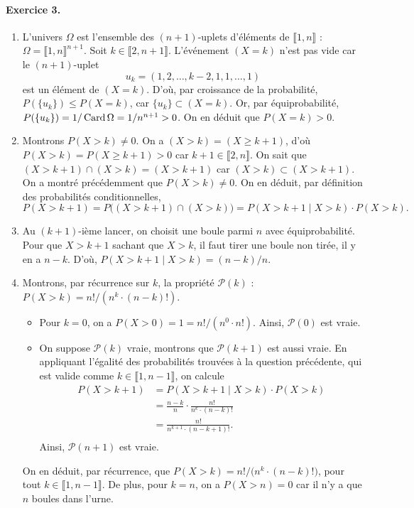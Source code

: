 \documentclass[a4paper]{article}
\begin{document}
	\paragraph{Exercice 3.}
	\begin{enumerate}
		\item L'univers $\Omega$ est l'ensemble des $(n+1)$-uplets d'éléments de $\llbracket 1,n \rrbracket$ : $\Omega = \llbracket 1,n \rrbracket^{n+1}$.
			Soit $k \in \llbracket 2,n+1 \rrbracket$. L'événement $(X = k)$\/ n'est pas vide car le $(n+1)$-uplet \[
				u_k = (1, 2, \ldots, {k-2}, 1, 1, \ldots, 1)
			\] est un élément de $(X = k)$.
			D'où, par croissance de la probabilité, $P(\{u_k\}) \le P(X = k)$, car $\{u_k\} \subset (X=k)$.
			Or, par équiprobabilité, $P(\{u_k\}) = 1 / \operatorname{Card} \Omega = 1 / n^{n+1} > 0$.
			On en déduit que $P(X = k) > 0$.
		\item Montrons $P(X > k) \neq 0$. On a $(X > k) = (X \ge k + 1)$, d'où $P(X > k) = P({X \ge k+1}) > 0$ car $k + 1 \in \llbracket 2,n \rrbracket$.
			On sait que $(X > k+ 1) \cap (X > k) = (X > k + 1)$ car $(X > k) \subset (X > k + 1)$.
			On a montré précédemment que $P(X > k) \neq 0$.
			On en déduit, par définition des probabilités conditionnelles, \[
				P(X > k + 1) = P\big((X > k+ 1) \cap (X > k)\big) = P(X > k + 1  \mid X > k) \cdot P(X > k)
			.\]
		\item Au $(k + 1)$-ième lancer, on choisit une boule parmi $n$ avec équiprobabilité.
			Pour que $X > k + 1$ sachant que $X > k$, il faut tirer une boule non tirée, il y en a $n - k$.
			D'où, $P(X > k + 1  \mid X > k) = (n-k) / n$.
		\item Montrons, par récurrence sur $k$, la propriété $\mathcal{P}(k)$ : \guillemotleft~$P(X > k) = n! / (n^k \cdot (n-k)!)$.~\guillemotright
			\begin{itemize}
				\item Pour $k = 0$, on a $P(X > 0) = 1 = n! / (n^0 \cdot n!)$.
					Ainsi, $\mathcal{P}(0)$ est vraie.
				\item On suppose $\mathcal{P}(k)$ vraie, montrons que $\mathcal{P}(k+1)$ est aussi vraie. En appliquant l'égalité des probabilités trouvées à la question précédente, qui est valide comme $k \in \llbracket 1,n - 1 \rrbracket$, on calcule
					\begin{align*}
						P(X > k + 1) &= P(X > k + 1  \mid X > k) \cdot P(X > k)\\
						&= \frac{n - k}{n}\cdot \frac{n!}{n^k \cdot (n-k)!} \\
						&= \frac{n!}{n^{k+1} \cdot (n-k+1)!}. \\
					\end{align*}
					Ainsi, $\mathcal{P}(n+1)$ est vraie.
			\end{itemize}
			On en déduit, par récurrence, que $P(X > k) = n! / \big(n^k \cdot (n -k)!\big)$, pour tout $k \in \llbracket 1,n-1 \rrbracket$.
			De plus, pour $k = n$, on a $P(X > n) = 0$ car il n'y a que $n$ boules dans l'urne.
	\end{enumerate}
\end{document}
